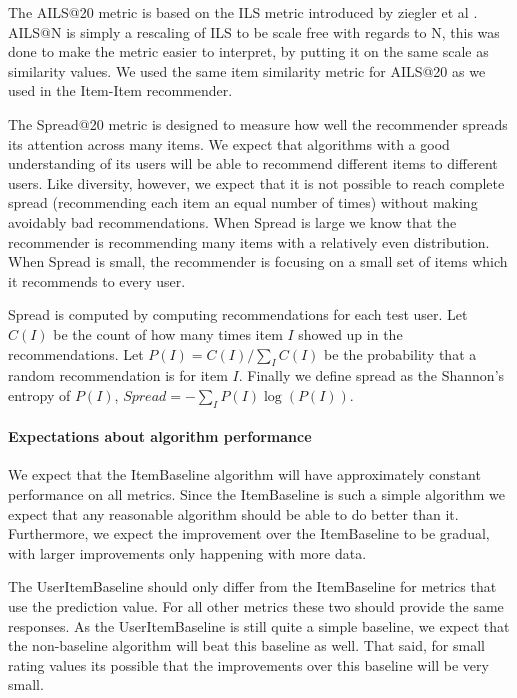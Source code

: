 \documentclass[letterpaper]{sig-alternate}
\begin{document}
  The AILS@20 metric is based on the ILS metric introduced by ziegler et al \cite{zieglerDiversity}.
  AILS@N is simply a rescaling of ILS to be scale free with regards to N, this was done to make the metric easier to interpret, by putting it on the same scale as similarity values.
  We used the same item similarity metric for AILS@20 as we used in the Item-Item recommender.

  The Spread@20 metric is designed to measure how well the recommender spreads its attention across many items.
  We expect that algorithms with a good understanding of its users will be able to recommend different items to different users.
  Like diversity, however, we expect that it is not possible to reach complete spread (recommending each item an equal number of times) without making avoidably bad recommendations.
  When Spread is large we know that the recommender is recommending many items with a relatively even distribution.
  When Spread is small, the recommender is focusing on a small set of items which it recommends to every user.

  Spread is computed by computing recommendations for each test user.
  Let $C(I)$ be the count of how many times item $I$ showed up in the recommendations.
  Let $P(I) = C(I) / \sum_I C(I)$ be the probability that a random recommendation is for item $I$.
  Finally we define spread as the Shannon's entropy of $P(I)$, $Spread = -\sum_I P(I) \log(P(I))$.

  \paragraph{Expectations about algorithm performance}
  We expect that the ItemBaseline algorithm will have approximately constant performance on all metrics.
  Since the ItemBaseline is such a simple algorithm we expect that any reasonable algorithm should be able to do better than it.
  Furthermore, we expect the improvement over the ItemBaseline to be gradual, with larger improvements only happening with more data.

  The UserItemBaseline should only differ from the ItemBaseline for metrics that use the prediction value.
  For all other metrics these two should provide the same responses.
  As the UserItemBaseline is still quite a simple baseline, we expect that the non-baseline algorithm will beat this baseline as well.
  That said, for small rating values its possible that the improvements over this baseline will be very small.
  
\end{document}
